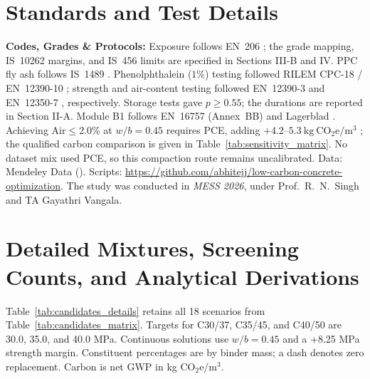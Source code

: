 \documentclass[journal]{IEEEtran}
\begin{document}



\appendices
\section{Standards and Test Details}
\label{sec:appendix_standards}
\textbf{Codes, Grades \& Protocols:} Exposure follows EN~206 \cite{en206}; the grade mapping, IS~10262 margins, and IS~456 limits are specified in Sections III-B and IV. PPC fly ash follows IS~1489 \cite{is1489}. Phenolphthalein ($1\%$) testing followed RILEM CPC-18 / EN~12390-10 \cite{hule2024}; strength and air-content testing followed EN~12390-3 \cite{en12390} and EN~12350-7 \cite{en12350}, respectively. Storage tests gave $p\ge0.55$; the durations are reported in Section II-A. Module B1 follows EN~16757 (Annex~BB) \cite{en16757} and Lagerblad \cite{lagerblad2005}. Achieving $\mathrm{Air}\le2.0\%$ at $w/b=0.45$ requires PCE, adding $+4.2\text{--}5.3\ \mathrm{kg\ CO_2e/m^3}$ \cite{efca2021}; the qualified carbon comparison is given in Table~\ref{tab:sensitivity_matrix}. No dataset mix used PCE, so this compaction route remains uncalibrated. Data: Mendeley Data \cite{hule2024mendeley} (\cite{hule2024}). Scripts: \url{https://github.com/abhitejj/low-carbon-concrete-optimization}. The study was conducted in \textit{MESS 2026}, under Prof.~R.~N.~Singh and TA Gayathri Vangala.

\clearpage
\onecolumn
\section{Detailed Mixtures, Screening Counts, and Analytical Derivations}
\label{sec:appendix_candidates}
\noindent Table~\ref{tab:candidates_details} retains all 18 scenarios from Table~\ref{tab:candidates_matrix}. Targets for C30/37, C35/45, and C40/50 are 30.0, 35.0, and 40.0 MPa. Continuous solutions use $w/b=0.45$ and a +8.25 MPa strength margin. Constituent percentages are by binder mass; a dash denotes zero replacement. Carbon is net GWP in kg CO$_2$e/m$^3$.
\end{document}
